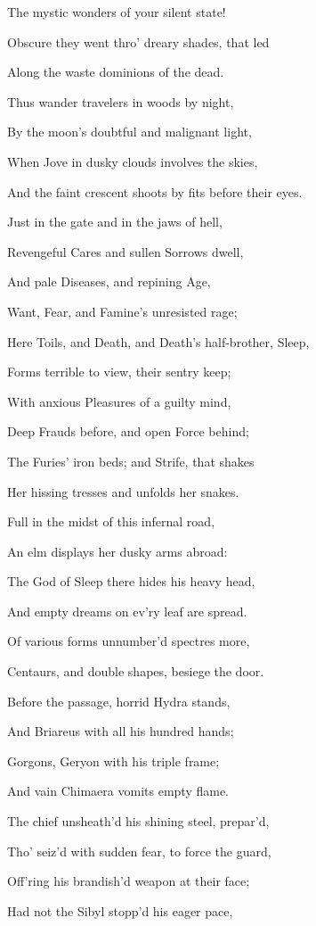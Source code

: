 The mystic wonders of your silent state!

Obscure they went thro’ dreary shades, that led

Along the waste dominions of the dead.

Thus wander travelers in woods by night,

By the moon’s doubtful and malignant light,

When Jove in dusky clouds involves the skies,

And the faint crescent shoots by fits before their eyes.

Just in the gate and in the jaws of hell,

Revengeful Cares and sullen Sorrows dwell,

And pale Diseases, and repining Age,

Want, Fear, and Famine’s unresisted rage;

Here Toils, and Death, and Death’s half-brother, Sleep,

Forms terrible to view, their sentry keep;

With anxious Pleasures of a guilty mind,

Deep Frauds before, and open Force behind;

The Furies’ iron beds; and Strife, that shakes

Her hissing tresses and unfolds her snakes.

Full in the midst of this infernal road,

An elm displays her dusky arms abroad:

The God of Sleep there hides his heavy head,

And empty dreams on ev’ry leaf are spread.

Of various forms unnumber’d spectres more,

Centaurs, and double shapes, besiege the door.

Before the passage, horrid Hydra stands,

And Briareus with all his hundred hands;

Gorgons, Geryon with his triple frame;

And vain Chimaera vomits empty flame.

The chief unsheath’d his shining steel, prepar’d,

Tho’ seiz’d with sudden fear, to force the guard,

Off’ring his brandish’d weapon at their face;

Had not the Sibyl stopp’d his eager pace,

